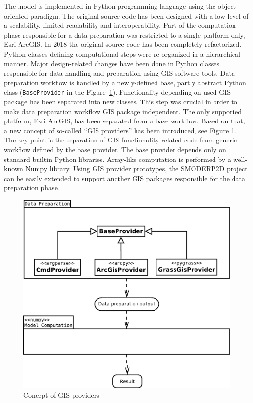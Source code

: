The model is implemented in Python programming language using the
object-oriented paradigm. The original source code has been designed
with a low level of a scalability, limited readability and
interoperability. Part of the computation phase responsible for a data
preparation was restricted to a single platform only, Esri ArcGIS. In
2018 the original source code has been completely refactorized. Python
classes defining computational steps were re-organized in a
hierarchical manner. Major design-related changes have been done in
Python classes responsible for data handling and preparation using GIS
software tools. Data preparation workflow is handled by a
newly-defined base, partly abstract Python class ({\tt BaseProvider}
in the Figure~\ref{fig:uml_diagram}). Functionality depending on used
GIS package has been separated into new classes. This step was crucial
in order to make data preparation workflow GIS package
independent. The only supported platform, Esri ArcGIS, has been
separated from a base workflow. Based on that, a new concept of
so-called “GIS providers” has been introduced, see
Figure \ref{fig:uml_diagram}. The key point is the separation of GIS
functionality related code from generic workflow defined by the base
provider. The base provider depends only on standard builtin Python
libraries. Array-like computation is performed by a well-known Numpy
library. Using GIS provider prototypes, the SMODERP2D project can be
easily extended to support another GIS packages responsible for the
data preparation phase.

\begin{figure}[ht!]
  \begin{center}
    \includegraphics[width=1.0\columnwidth]{figures/uml_diagram.pdf}
    \caption{Concept of GIS providers}
    \label{fig:uml_diagram}
  \end{center}
\end{figure}

